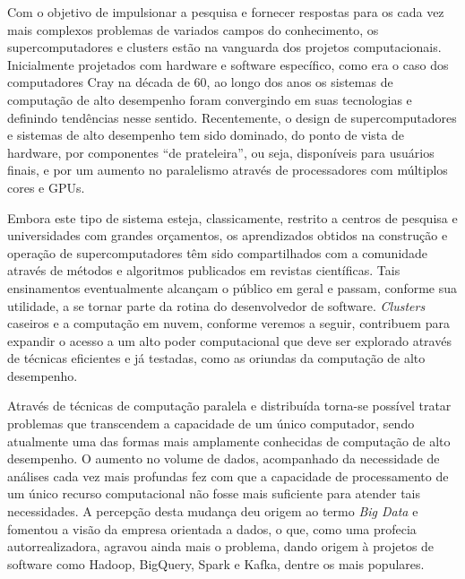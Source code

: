 \documentclass[english,brazilian]{UNISINOSmonografia} %
\begin{document}


Com o objetivo de impulsionar a pesquisa e fornecer respostas para os cada vez mais complexos problemas de variados campos do conhecimento, os supercomputadores e clusters estão na vanguarda dos projetos computacionais.
Inicialmente projetados com hardware e software específico, como era o caso dos computadores Cray na década de 60, ao longo dos anos os sistemas de computação de alto desempenho foram convergindo em suas tecnologias e definindo tendências nesse sentido.
Recentemente, o design de supercomputadores e sistemas de alto desempenho tem sido dominado, do ponto de vista de hardware, por componentes ``de prateleira'', ou seja, disponíveis para usuários finais, e por um aumento no paralelismo através de processadores com múltiplos cores e GPUs.


Embora este tipo de sistema esteja, classicamente, restrito a centros de pesquisa e universidades com grandes orçamentos, os aprendizados obtidos na construção e operação de supercomputadores têm sido compartilhados com a comunidade através de métodos e algoritmos publicados em revistas científicas.
Tais ensinamentos eventualmente alcançam o público em geral e passam, conforme sua utilidade, a se tornar parte da rotina do desenvolvedor de software.
\textit{Clusters} caseiros e a computação em nuvem, conforme veremos a seguir, contribuem para expandir o acesso a um alto poder computacional que deve ser explorado através de técnicas eficientes e já testadas, como as oriundas da computação de alto desempenho.


Através de técnicas de computação paralela e distribuída torna-se possível tratar problemas que transcendem a capacidade de um único computador, sendo atualmente uma das formas mais amplamente conhecidas de computação de alto desempenho.
O aumento no volume de dados, acompanhado da necessidade de análises cada vez mais profundas fez com que a capacidade de processamento de um único recurso computacional não fosse mais suficiente para atender tais necessidades.
A percepção desta mudança deu origem ao termo \textit{Big Data} e fomentou a visão da empresa orientada a dados, o que, como uma profecia autorrealizadora, agravou ainda mais o problema, dando origem à projetos de software como Hadoop, BigQuery, Spark e Kafka, dentre os mais populares.
\end{document}
